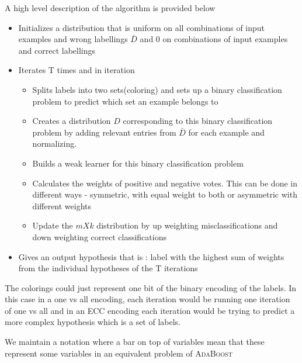 \documentclass[11pt]{article}
\begin{document}
A high level description of the algorithm is provided below
\begin{itemize}
\item Initializes a distribution that is uniform on all combinations of input examples and wrong labellings $\bar D$ and 0 on combinations of input examples and correct labellings
\item Iterates T times and in iteration
\begin{itemize}
\item Splits labels into two sets(coloring) and sets up a binary classification problem to predict which set an example belongs to
\item Creates a distribution $D$ corresponding to this binary classification problem by adding relevant entries from $\bar D$ for each example and normalizing.
\item Builds a weak learner for this binary classification problem
\item Calculates the weights of positive and negative votes. This can be done in different ways - symmetric, with equal weight to both or asymmetric with different weights
\item Update the $m X k$ distribution by up weighting misclassifications and down weighting correct classifications
\end{itemize}
\item Gives an output hypothesis that is : label with the highest sum of weights from the individual hypotheses of the T iterations
\end{itemize}

The colorings could just represent one bit of the binary encoding of the labels. In this case in a one vs all encoding, each iteration would be running one iteration of one vs all and in an ECC encoding each iteration would be trying to predict a more complex hypothesis which is a set of labels.

We maintain a notation where a bar on top of variables mean that these represent some variables in an equivalent problem of \textsc{AdaBoost}
\end{document}
